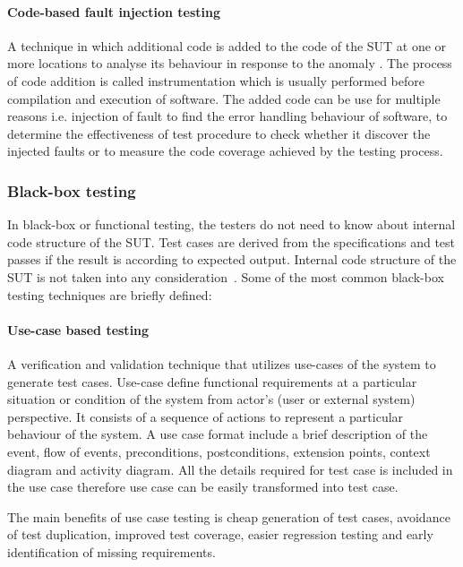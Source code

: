 \paragraph{Code-based fault injection testing}
A technique in which additional code is added to the code of the SUT at one or more locations to analyse its behaviour in response to the anomaly \cite{voas1997software}. The process of code addition is called instrumentation which is usually performed before compilation and execution of software. The added code can be use for multiple reasons i.e. injection of fault to find the error handling behaviour of software, to determine the effectiveness of test procedure to check whether it discover the injected faults or to measure the code coverage achieved by the testing process.    

\subsubsection{Black-box testing}
In black-box or functional testing, the testers do not need to know about internal code structure of the SUT. Test cases are derived from the specifications and test passes if the result is according to expected output. Internal code structure of the SUT is not taken into any consideration~\cite{beizer1995black}. Some of the most common black-box testing techniques are briefly defined:

\paragraph{Use-case based testing}
A verification and validation technique that utilizes use-cases of the system to generate test cases. Use-case define functional requirements at a particular situation or condition of the system from actor's (user or external system) perspective. It consists of a sequence of actions to represent a particular behaviour of the system. A use case format include a brief description of the event, flow of events, preconditions, postconditions, extension points, context diagram and activity diagram. 
All the details required for test case is included in the use case therefore use case can be easily transformed into test case. 


The main benefits of use case testing is cheap generation of test cases, avoidance of test duplication, improved test coverage, easier regression testing and early identification of missing requirements.  

